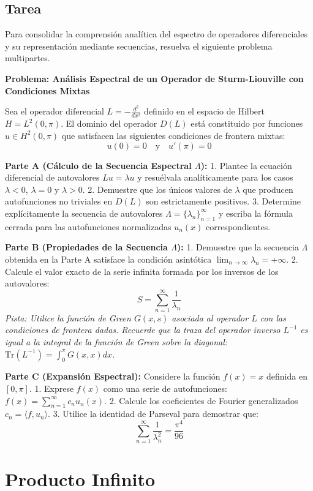 \documentclass[a4paper]{article}
\begin{document}
\subsection{Tarea}

Para consolidar la comprensión analítica del espectro de operadores diferenciales y su representación mediante secuencias, resuelva el siguiente problema multipartes.

\textbf{Problema: Análisis Espectral de un Operador de Sturm-Liouville con Condiciones Mixtas}

Sea el operador diferencial $L = -\frac{d^2}{dx^2}$ definido en el espacio de Hilbert $H = L^2(0, \pi)$. El dominio del operador $D(L)$ está constituido por funciones $u \in H^2(0, \pi)$ que satisfacen las siguientes condiciones de frontera mixtas:
$$ u(0) = 0 \quad \text{y} \quad u'(\pi) = 0 $$

\textbf{Parte A (Cálculo de la Secuencia Espectral $\Lambda$):}
1. Plantee la ecuación diferencial de autovalores $Lu = \lambda u$ y resuélvala analíticamente para los casos $\lambda < 0$, $\lambda = 0$ y $\lambda > 0$.
2. Demuestre que los únicos valores de $\lambda$ que producen autofunciones no triviales en $D(L)$ son estrictamente positivos.
3. Determine explícitamente la secuencia de autovalores $\Lambda = \{\lambda_n\}_{n=1}^{\infty}$ y escriba la fórmula cerrada para las autofunciones normalizadas $u_n(x)$ correspondientes.

\textbf{Parte B (Propiedades de la Secuencia $\Lambda$):}
1. Demuestre que la secuencia $\Lambda$ obtenida en la Parte A satisface la condición asintótica $\lim_{n \to \infty} \lambda_n = +\infty$.
2. Calcule el valor exacto de la serie infinita formada por los inversos de los autovalores:
$$ S = \sum_{n=1}^{\infty} \frac{1}{\lambda_n} $$
\textit{Pista: Utilice la función de Green $G(x, s)$ asociada al operador $L$ con las condiciones de frontera dadas. Recuerde que la traza del operador inverso $L^{-1}$ es igual a la integral de la función de Green sobre la diagonal: $\text{Tr}(L^{-1}) = \int_0^{\pi} G(x, x) dx$.}

\textbf{Parte C (Expansión Espectral):}
Considere la función $f(x) = x$ definida en $[0, \pi]$. 
1. Exprese $f(x)$ como una serie de autofunciones: $f(x) = \sum_{n=1}^{\infty} c_n u_n(x)$.
2. Calcule los coeficientes de Fourier generalizados $c_n = \langle f, u_n \rangle$.
3. Utilice la identidad de Parseval para demostrar que:
$$ \sum_{n=1}^{\infty} \frac{1}{\lambda_n^2} = \frac{\pi^4}{96} $$

\section{Producto Infinito}
\end{document}
